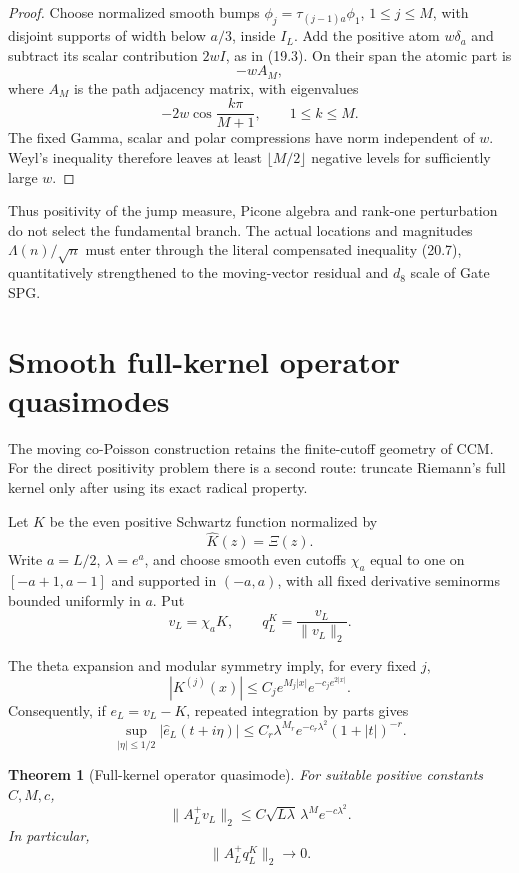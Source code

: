 \documentclass[11pt]{amsart}
\newtheorem{theorem}{Theorem}[section]
\theoremstyle{definition}
\theoremstyle{remark}
\begin{document}
\begin{proof}
Choose normalized smooth bumps
\(\phi_j=\tau_{(j-1)a}\phi_1\), \(1\le j\le M\), with disjoint supports
of width below \(a/3\), inside \(I_L\).  Add the
positive atom \(w\delta_a\) and subtract its scalar contribution \(2wI\),
as in (19.3).  On their span the atomic part is
\[
 -wA_M,
\]
where \(A_M\) is the path adjacency matrix, with eigenvalues
\[
 -2w\cos\frac{k\pi}{M+1},
 \qquad1\le k\le M.
\]
The fixed Gamma, scalar and polar compressions have norm independent of
\(w\).  Weyl's inequality \cite[Ch.~III]{Bhatia} therefore leaves at least
\(\lfloor M/2\rfloor\) negative levels for sufficiently large \(w\).
\end{proof}

Thus positivity of the jump measure, Picone algebra and
rank-one perturbation do not select the fundamental branch.  The actual
locations and magnitudes \(\Lambda(n)/\sqrt n\) must enter through the
literal compensated inequality (20.7), quantitatively strengthened to the
moving-vector residual and \(d_8\) scale of Gate SPG.

\section{Smooth full-kernel operator quasimodes}
\label{sec:full-kernel-quasimode}

The moving co-Poisson construction retains the finite-cutoff geometry of
CCM.  For the direct positivity problem there is a second route: truncate
Riemann's full kernel only after using its exact radical property.

Let \(K\) be the even positive Schwartz function normalized by
\[
 \widehat K(z)=\Xi(z).
\tag{22.1}
\]
Write \(a=L/2\), \(\lambda=e^a\), and choose smooth even cutoffs
\(\chi_a\) equal to one on \([-a+1,a-1]\) and supported in
\((-a,a)\), with all fixed derivative seminorms bounded uniformly in
\(a\).  Put
\[
 v_L=\chi_aK,\qquad q_L^K=\frac{v_L}{\|v_L\|_2}.
\tag{22.2}
\]

The theta expansion and modular symmetry imply, for every fixed \(j\),
\[
 |K^{(j)}(x)|
 \le C_j e^{M_j|x|}e^{-c_je^{2|x|}}.
\tag{22.3}
\]
Consequently, if \(e_L=v_L-K\), repeated integration by parts gives
\[
 \sup_{|\eta|\le1/2}|\widehat e_L(t+i\eta)|
 \le C_r\lambda^{M_r}e^{-c_r\lambda^2}(1+|t|)^{-r}.
\tag{22.4}
\]

\begin{theorem}[Full-kernel operator quasimode]
\label{thm:full-kernel-quasimode}
For suitable positive constants \(C,M,c\),
\[
 \|A_L^+v_L\|_2
 \le C\sqrt{L\lambda}\,\lambda^Me^{-c\lambda^2}.
\tag{22.5}
\]
In particular,
\[
 \|A_L^+q_L^K\|_2\longrightarrow0.
\tag{22.6}
\]
\end{theorem}
\end{document}
